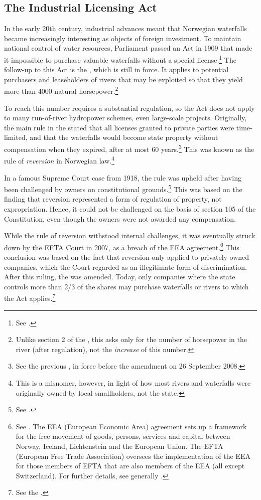 \subsection{The Industrial Licensing Act}\label{sec:ica17}

In the early 20th century, industrial advances meant that Norwegian waterfalls became increasingly interesting as objects of foreign investment. To maintain national control of water resources, Parliament passed an Act in 1909 that made it impossible to purchase valuable waterfalls without a special license.\footnote{See \cite[59]{falkanger87}.} The follow-up to this Act is the \cite{ica17}, which is still in force. It applies to potential purchasers and leaseholders of rivers that may be exploited so that they yield more than 4000 natural horsepower.\footnote{Unlike section 2 of the \cite{wra17}, this asks only for the number of horsepower in the river (after regulation), not the {\it increase} of this number.}

To reach this number requires a substantial regulation, so the Act does not apply to many run-of-river hydropower schemes, even large-scale projects. Originally, the main rule in the \cite{ica17} stated that all licenses granted to private parties were time-limited, and that the waterfalls would become state property without compensation when they expired, after at most 60 years.\footnote{See the previous \dni\cite[2]{ica17}, in force before the amendment on 26 September 2008.} This was known as the rule of {\it reversion} in Norwegian law.\footnote{This is a misnomer, however, in light of how most rivers and waterfalls were originally owned by local smallholders, not the state.}

In a famous Supreme Court case from 1918, the rule was upheld after having been challenged by owners on constitutional grounds.\footnote{See \cite{johansen18}.} This was based on the finding that reversion represented a form of regulation of property, not expropriation. Hence, it could not be challenged on the basis of section 105 of the Constitution, even though the owners were not awarded any compensation. 

While the rule of reversion withstood internal challenges, it was eventually struck down by the EFTA Court in 2007, as a breach of the EEA agreement.\footnote{See \cite{efta07}. The EEA (European Economic Area) agreement sets up a framework for the free movement of goods, persons, services and capital between Norway, Iceland, Lichtenstein and the European Union. The EFTA (European Free Trade Association) oversees the implementation of the EEA for those members of EFTA that are also members of the EEA (all except Switzerland). For further details, see generally \cite{bull94,magnussen02,fredriksen09}.} This conclusion was based on the fact that reversion only applied to privately owned companies, which the Court regarded as an illegitimate form of discrimination. After this ruling, the \cite{ica17} was amended. Today, only companies where the state controls more than 2/3 of the shares may purchase waterfalls or rivers to which the Act applies.\footnote{See the \dni\cite[2]{ica17}.}

